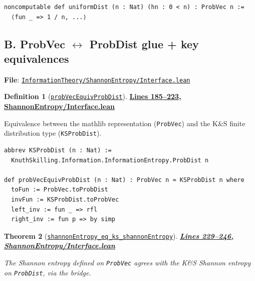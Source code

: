 \documentclass[11pt]{article}
\newtheorem{theorem}{Theorem}[section]
\theoremstyle{definition}
\newtheorem{definition}[theorem]{Definition}
\theoremstyle{remark}
\begin{document}
\begin{lstlisting}[caption={Uniform distribution on Fin n}]
noncomputable def uniformDist (n : Nat) (hn : 0 < n) : ProbVec n :=
  ⟨fun _ => 1 / n, ...⟩
\end{lstlisting}

\subsection*{B. ProbVec $\leftrightarrow$ ProbDist glue + key equivalences}

\textbf{File}: \href{https://github.com/zariuq/MeTTapedia/blob/main/lean/mettapedia/Mettapedia/InformationTheory/ShannonEntropy/Interface.lean}{\texttt{InformationTheory/ShannonEntropy/Interface.lean}}

\begin{definition}[\href{https://github.com/zariuq/MeTTapedia/blob/main/lean/mettapedia/Mettapedia/InformationTheory/ShannonEntropy/Interface.lean\#L219}{\texttt{probVecEquivProbDist}}]
\textbf{\href{https://github.com/zariuq/MeTTapedia/blob/main/lean/mettapedia/Mettapedia/InformationTheory/ShannonEntropy/Interface.lean\#L185-L223}{Lines 185--223, ShannonEntropy/Interface.lean}}

Equivalence between the mathlib representation (\texttt{ProbVec}) and the K\&S finite distribution
type (\texttt{KSProbDist}).
\end{definition}

\begin{lstlisting}[caption={ProbVec n $\simeq$ KSProbDist n (conversion equivalence)}]
abbrev KSProbDist (n : Nat) :=
  KnuthSkilling.Information.InformationEntropy.ProbDist n

def probVecEquivProbDist (n : Nat) : ProbVec n ≃ KSProbDist n where
  toFun := ProbVec.toProbDist
  invFun := KSProbDist.toProbVec
  left_inv := fun _ => rfl
  right_inv := fun p => by simp
\end{lstlisting}

\begin{theorem}[\href{https://github.com/zariuq/MeTTapedia/blob/main/lean/mettapedia/Mettapedia/InformationTheory/ShannonEntropy/Interface.lean\#L234}{\texttt{shannonEntropy\_eq\_ks\_shannonEntropy}}]
\textbf{\href{https://github.com/zariuq/MeTTapedia/blob/main/lean/mettapedia/Mettapedia/InformationTheory/ShannonEntropy/Interface.lean\#L229-L246}{Lines 229--246, ShannonEntropy/Interface.lean}}

The Shannon entropy defined on \texttt{ProbVec} agrees with the K\&S Shannon entropy on \texttt{ProbDist},
via the bridge.
\end{theorem}
\end{document}
